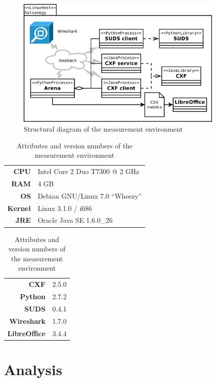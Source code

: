 \begin{figure}[htbp]
 \centering
 \includegraphics[width=0.9\textwidth]{images/measurenv.pdf}
 \caption{Structural diagram of the measurement environment}
 \label{fig:measurenv}
\end{figure}

\begin{table}[htbp]
 \centering
 \toprule
 \begin{minipage}[t]{0.55\linewidth}
  \centering
  \begin{tabular}{rl}
  \textbf{CPU} & Intel Core 2 Duo T7300 @ 2 GHz \\
  \textbf{RAM} & 4 GB \\
  \textbf{OS} & Debian GNU/Linux 7.0 ``Wheezy'' \\
  \textbf{Kernel} & Linux 3.1.0 / i686 \\
  \textbf{JRE} & Oracle Java SE 1.6.0\_26 \\
  \end{tabular}
 \end{minipage}
 \begin{minipage}[t]{0.3\linewidth}
  \centering
  \begin{tabular}{rl}
  \textbf{CXF} & 2.5.0 \\
  \textbf{Python} & 2.7.2 \\
  \textbf{SUDS} & 0.4.1 \\
  \textbf{Wireshark} & 1.7.0 \\
  \textbf{LibreOffice} & 3.4.4
  \end{tabular}
 \end{minipage}
 \bottomrule
 \caption{Attributes and version numbers of the measurement environment}
 \label{tab:measurenv}
\end{table}

\section{Analysis}

